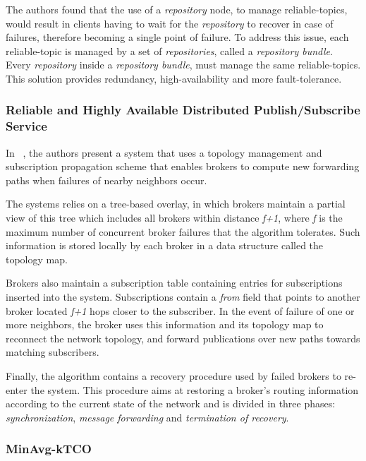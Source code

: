 The authors found that the use of a \textit{repository} node, to manage reliable-topics, would result in clients having to wait for the \textit{repository} to recover in case of failures, therefore becoming a single point of failure. To address this issue, each reliable-topic is managed by a set of \textit{repositories}, called a \textit{repository bundle}. Every \textit{repository} inside a \textit{repository bundle}, must manage the same reliable-topics. This solution provides redundancy, high-availability and more fault-tolerance.

\subsubsection{Reliable and Highly Available Distributed Publish/Subscribe Service}
\label{sec:reliable_and_highly_available_distributed_pubsub}

In ~\cite{reliable-highly-available-pub-sub}, the authors present a system that uses a topology management and subscription propagation scheme that enables brokers to compute new forwarding paths when failures of nearby neighbors occur.

The systems relies on a tree-based overlay, in which brokers maintain a partial view of this tree which includes all brokers within distance \textit{f+1}, where \textit{f} is the maximum number of concurrent broker failures that the algorithm tolerates. Such information is stored locally by each broker in a data structure called the  topology map.

Brokers also maintain a subscription table containing entries for subscriptions inserted into the system. Subscriptions contain a \textit{from} field that points to another broker located \textit{f+1} hops closer to the subscriber. In the event of failure of one or more neighbors, the broker uses this information and its topology map to reconnect the network topology, and forward publications over new paths towards matching subscribers.

Finally, the algorithm contains a recovery procedure used by failed brokers to re-enter the system. This procedure aims at restoring a broker's routing information according to the current state of the network and is divided in three phases: \textit{synchronization}, \textit{message forwarding} and \textit{termination of recovery}.  

\subsubsection{MinAvg-kTCO}
\label{sec:minavg_tco}

